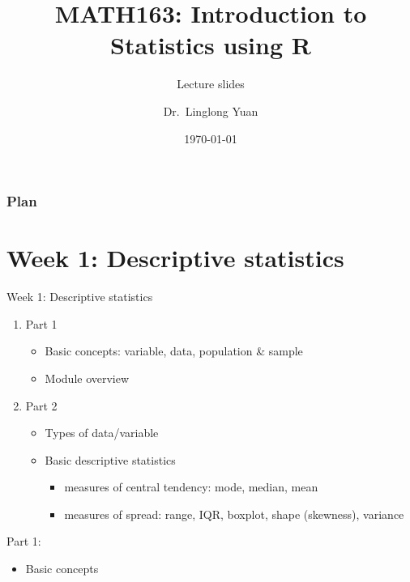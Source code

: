 \documentclass{beamer}
\title{MATH163: Introduction to Statistics using R}
\subtitle{Lecture slides}
\author{Dr.\ Linglong Yuan}
\institute{University of Liverpool}
\date{\today}
\begin{document}
\begin{frame}
  \titlepage
\end{frame}


\begin{frame}
\frametitle{Plan}
  \tableofcontents
\end{frame}


\section{Week 1: Descriptive statistics}

\begin{frame}{Week 1: Descriptive statistics }



\begin{enumerate}
\item Part 1 
\begin{itemize}
\item Basic concepts: variable, data, population \& sample
\item Module overview
\end{itemize}
\item Part 2 
\begin{itemize}
\item Types of data/variable
\item Basic descriptive statistics
\begin{itemize}
\item measures of central tendency: mode, median, mean
\item measures of spread: range, IQR, boxplot, shape (skewness), variance
\end{itemize}
\end{itemize}

\end{enumerate}

\end{frame}

\begin{frame}

Part 1: \begin{itemize}
\item Basic concepts
\end{itemize}
\end{frame}
\end{document}
